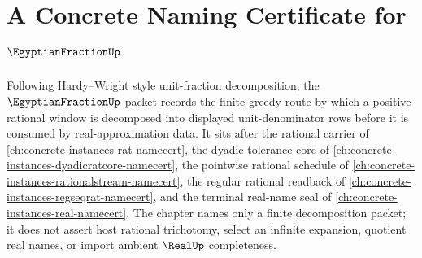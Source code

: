 \chapter{A Concrete Naming Certificate for $\EgyptianFractionUp$}
\label{ch:concrete-instances-egyptian-fraction-namecert}

Following Hardy--Wright style unit-fraction decomposition, the $\EgyptianFractionUp$ packet records the finite greedy route by which a positive rational window is decomposed into displayed unit-denominator rows before it is consumed by real-approximation data. It sits after the rational carrier of \autoref{ch:concrete-instances-rat-namecert}, the dyadic tolerance core of \autoref{ch:concrete-instances-dyadicratcore-namecert}, the pointwise rational schedule of \autoref{ch:concrete-instances-rationalstream-namecert}, the regular rational readback of \autoref{ch:concrete-instances-regseqrat-namecert}, and the terminal real-name seal of \autoref{ch:concrete-instances-real-namecert}. The chapter names only a finite decomposition packet; it does not assert host rational trichotomy, select an infinite expansion, quotient real names, or import ambient $\RealUp$ completeness.

